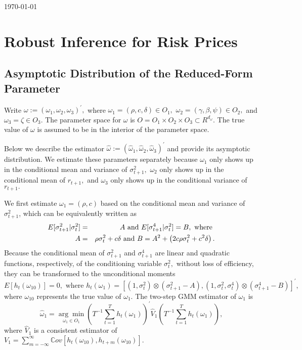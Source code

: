 \documentclass[11pt]{article}
\begin{document}
\noindent 
\today%

\bigskip

\section{Robust Inference for Risk Prices}

\subsection{Asymptotic Distribution of the Reduced-Form Parameter}

Write $\omega :=(\omega _{1},\omega _{2},\omega _{3})^{\prime },$ where $%
\omega _{1}=(\rho ,c,\delta )\in O_{1},$ $\omega _{2}=(\gamma ,\beta ,\psi
)\in O_{2},$ and $\omega _{3}=\zeta \in O_{3}.$ The parameter space for $%
\omega $ is $O=O_{1}\times O_{2}\times O_{3}\subset R^{d_{\omega }}.$ The
true value of $\omega $ is assumed to be in the interior of the parameter
space.

Below we describe the estimator $\widehat{\omega }:=(\widehat{\omega }_{1},%
\widehat{\omega }_{2},\widehat{\omega }_{3})^{\prime }$ and provide its
asymptotic distribution. We estimate these parameters separately because $%
\omega _{1}$ only shows up in the conditional mean and variance of $\sigma
_{t+1}^{2},$ $\omega _{2}$ only shows up in the conditional mean of $r_{t+1},
$ and $\omega _{3}$ only shows up in the conditional variance of $r_{t+1}.$

We first estimate $\omega _{1}=(\rho ,c)$ based on the conditional mean and
variance of $\sigma _{t+1}^{2}$, which can be equivalently written as 
\begin{eqnarray}
E[\sigma _{t+1}^{2}|\sigma _{t}^{2}] &=&A\text{ and }E[\sigma
_{t+1}^{4}|\sigma _{t}^{2}]=B,\text{ where }  \notag \\
A &=&\rho \sigma _{t}^{2}+c\delta \text{ and }B=A^{2}+\left( 2c\rho \sigma
_{t}^{2}+c^{2}\delta \right) .
\end{eqnarray}%
Because the conditional mean of $\sigma _{t+1}^{2}$ and $\sigma _{t+1}^{4}$
are linear and quadratic functions, respectively, of the conditioning
variable $\sigma _{t}^{2},$ without loss of efficiency, they can be
transformed to the unconditional moments%
\begin{equation}
E[h_{t}(\omega _{10})]=0,\text{ where }h_{t}(\omega _{1})=[(1,\sigma
_{t}^{2})\otimes (\sigma _{t+1}^{2}-A),(1,\sigma _{t}^{2},\sigma
_{t}^{4})\otimes (\sigma _{t+1}^{4}-B)]^{\prime },
\end{equation}%
where $\omega _{10}$ represents the true value of $\omega _{1}.$ The
two-step GMM estimator of $\omega _{1}$ is%
\begin{equation}
\widehat{\omega }_{1}=\underset{\omega _{1}\in O_{1}}{\arg \min }\left(
T^{-1}\sum_{t=1}^{T}h_{t}(\omega _{1})\right) ^{\prime }\widehat{V}%
_{1}\left( T^{-1}\sum_{t=1}^{T}h_{t}(\omega _{1})\right) ,
\label{omega 1 est}
\end{equation}%
where $\widehat{V}_{1}$ is a consistent estimator of $V_{1}=\sum_{m=-\infty
}^{\infty }\mathbb{C}ov[h_{t}(\omega _{10}),h_{t+m}(\omega _{10})].$
\end{document}

